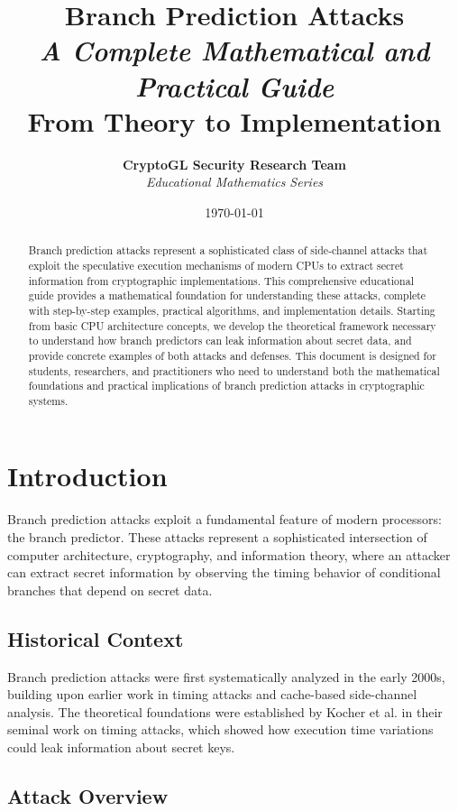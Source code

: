 \documentclass[11pt,a4paper]{article}
\title{
    \Huge\textbf{Branch Prediction Attacks} \\
    \Large\textit{A Complete Mathematical and Practical Guide} \\
    \large From Theory to Implementation
}
\author{
    \textbf{CryptoGL Security Research Team} \\
    \textit{Educational Mathematics Series}
}
\date{\today}
\theoremstyle{definition}
\begin{document}
\maketitle

\begin{abstract}
Branch prediction attacks represent a sophisticated class of side-channel attacks that exploit the speculative execution mechanisms of modern CPUs to extract secret information from cryptographic implementations. This comprehensive educational guide provides a mathematical foundation for understanding these attacks, complete with step-by-step examples, practical algorithms, and implementation details. Starting from basic CPU architecture concepts, we develop the theoretical framework necessary to understand how branch predictors can leak information about secret data, and provide concrete examples of both attacks and defenses. This document is designed for students, researchers, and practitioners who need to understand both the mathematical foundations and practical implications of branch prediction attacks in cryptographic systems.
\end{abstract}

\tableofcontents
\newpage

\section{Introduction}

Branch prediction attacks exploit a fundamental feature of modern processors: the branch predictor. These attacks represent a sophisticated intersection of computer architecture, cryptography, and information theory, where an attacker can extract secret information by observing the timing behavior of conditional branches that depend on secret data.

\subsection{Historical Context}

Branch prediction attacks were first systematically analyzed in the early 2000s, building upon earlier work in timing attacks and cache-based side-channel analysis. The theoretical foundations were established by Kocher et al. \cite{kocher1996timing} in their seminal work on timing attacks, which showed how execution time variations could leak information about secret keys.

\subsection{Attack Overview}
\end{document}
